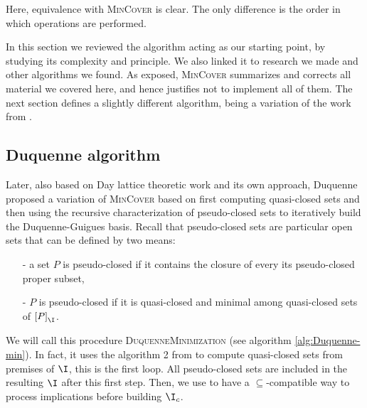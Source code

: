 \noindent Here, equivalence with \textsc{MinCover} is clear. The only difference
is the order in which operations are performed. 

\vspace{1.2em}

In this section we reviewed the algorithm acting as our starting point, by 
studying its complexity and principle. We also linked it to research we made
and other algorithms we found. As exposed, \textsc{MinCover} summarizes and 
corrects all material we covered here, and hence justifies not to implement
all of them. The next section defines a slightly different algorithm, being a
variation of the work from \cite{day_lattice_1992}.

\subsection{Duquenne algorithm}

Later, also based on Day lattice theoretic work and its own approach, Duquenne
proposed a variation of \textsc{MinCover} based on first computing quasi-closed
sets and then using the recursive characterization of pseudo-closed sets to iteratively build the Duquenne-Guigues basis. Recall that pseudo-closed sets
are particular open sets that can be defined by two means:
\begin{itemize}
	\item[-] a set $P$ is pseudo-closed if it contains the closure of every its
	pseudo-closed proper subset,
	\item[-] $P$ is pseudo-closed if it is quasi-closed and minimal among quasi-closed sets of $\left[ P \right]_{\I}$.
\end{itemize}
We will call this procedure \textsc{DuquenneMinimization} (see algorithm \ref{alg:Duquenne-min}). In fact, it uses the algorithm 2 from \cite{day_lattice_1992} to compute quasi-closed sets from premises of $\I$,
this is the first loop. All pseudo-closed sets are included in the resulting $\I$ after this first step. Then, we use  to have a $\subseteq$-compatible way to process implications before building $\I_c$.


